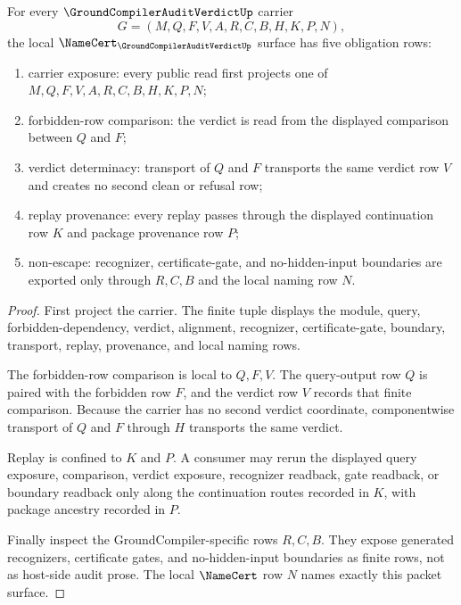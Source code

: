 \begin{theorem}
\label{thm:groundcompiler-audit-verdict-obligations}
For every $\GroundCompilerAuditVerdictUp$ carrier
$$
G=(M,Q,F,V,A,R,C,B,H,K,P,N),
$$
the local $\NameCert_{\GroundCompilerAuditVerdictUp}$ surface has five obligation rows:
\begin{enumerate}
\item carrier exposure: every public read first projects one of $M,Q,F,V,A,R,C,B,H,K,P,N$;
\item forbidden-row comparison: the verdict is read from the displayed comparison between $Q$ and $F$;
\item verdict determinacy: transport of $Q$ and $F$ transports the same verdict row $V$ and creates no second clean or refusal row;
\item replay provenance: every replay passes through the displayed continuation row $K$ and package provenance row $P$;
\item non-escape: recognizer, certificate-gate, and no-hidden-input boundaries are exported only through $R,C,B$ and the local naming row $N$.
\end{enumerate}
\end{theorem}
\begin{proof}
First project the carrier. The finite tuple displays the module, query, forbidden-dependency, verdict, alignment, recognizer, certificate-gate, boundary, transport, replay, provenance, and local naming rows.

The forbidden-row comparison is local to $Q,F,V$. The query-output row $Q$ is paired with the forbidden row $F$, and the verdict row $V$ records that finite comparison. Because the carrier has no second verdict coordinate, componentwise transport of $Q$ and $F$ through $H$ transports the same verdict.

Replay is confined to $K$ and $P$. A consumer may rerun the displayed query exposure, comparison, verdict exposure, recognizer readback, gate readback, or boundary readback only along the continuation routes recorded in $K$, with package ancestry recorded in $P$.

Finally inspect the GroundCompiler-specific rows $R,C,B$. They expose generated recognizers, certificate gates, and no-hidden-input boundaries as finite rows, not as host-side audit prose. The local $\NameCert$ row $N$ names exactly this packet surface.
\end{proof}

